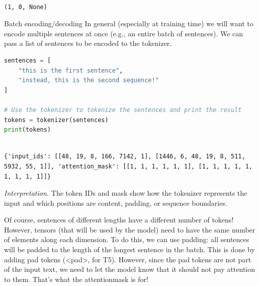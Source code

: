 \documentclass[../labs.tex]{subfiles}
\begin{document}
\hypertarget{res:lab02-text-01-t5-ipynb-28-8cd92e832794}{}

\begin{lstlisting}[basicstyle=\ttfamily\scriptsize,breaklines=true,breakatwhitespace=false,columns=fullflexible,keepspaces=true]

(1, 0, None)

\end{lstlisting}



\noindent Batch encoding/decoding In general (especially at training time) we will want to encode multiple sentences at once (e.g., an entire batch of sentences). We can pass a list of sentences to be encoded to the tokenizer.

\begin{lstlisting}[language=Python,basicstyle=\ttfamily\scriptsize,breaklines=true,breakatwhitespace=false,columns=fullflexible,keepspaces=true,numbers=none]
sentences = [
    "this is the first sentence",
    "instead, this is the second sequence!"
]

# Use the tokenizer to tokenize the sentences and print the result
tokens = tokenizer(sentences)
print(tokens)
\end{lstlisting}

\hypertarget{res:lab02-text-01-t5-ipynb-30-ffc9a72dce90}{}

\begin{lstlisting}[basicstyle=\ttfamily\scriptsize,breaklines=true,breakatwhitespace=false,columns=fullflexible,keepspaces=true]

{'input_ids': [[48, 19, 8, 166, 7142, 1], [1446, 6, 48, 19, 8, 511, 5932, 55, 1]], 'attention_mask': [[1, 1, 1, 1, 1, 1], [1, 1, 1, 1, 1, 1, 1, 1, 1]]}

\end{lstlisting}

\noindent\emph{Interpretation.} The token IDs and mask show how the tokenizer represents the input and which positions are content, padding, or sequence boundaries.



\noindent Of course, sentences of different lengths have a different number of tokens! However, tensors (that will be used by the model) need to have the same number of elements along each dimension. To do this, we can use padding: all sentences will be padded to the length of the longest sentence in the batch. This is done by adding pad tokens (<pad>, for T5). However, since the pad tokens are not part of the input text, we need to let the model know that it should not pay attention to them. That's what the attentionmask is for!
\end{document}
